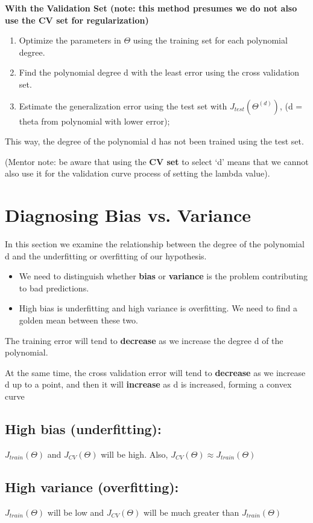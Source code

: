 \textbf{With the Validation Set (note: this method presumes we do not also use the CV set for regularization)}

\begin{enumerate}
\item Optimize the parameters in $\Theta$ using the training set for each polynomial degree.
\item Find the polynomial degree d with the least error using the cross validation set.
\item Estimate the generalization error using the test set with $J_{test}(\Theta^{(d)})$, (d = theta from polynomial with lower error);
\end{enumerate}

This way, the degree of the polynomial d has not been trained using the test set.

(Mentor note: be aware that using the \textbf{CV set} to select `d' means that we cannot also use it for the validation curve process of setting the lambda value).

\section{Diagnosing Bias vs. Variance}
In this section we examine the relationship between the degree of the polynomial d and the underfitting or overfitting of our hypothesis.
\begin{itemize}
\item We need to distinguish whether \textbf{bias} or \textbf{variance} is the problem contributing to bad predictions.
\item High bias is underfitting and high variance is overfitting. We need to find a golden mean between these two.
\end{itemize}

The training error will tend to \textbf{decrease} as we increase the degree d of the polynomial.

At the same time, the cross validation error will tend to \textbf{decrease} as we increase d up to a point, and then it will \textbf{increase} as d is increased, forming a convex curve
\subsection{High bias (underfitting): }
$J_{train}(\Theta)$ and $J_{CV}(\Theta)$ will be high. Also, $J_{CV}(\Theta) \approx J_{train}(\Theta)$ 
\subsection{High variance (overfitting):}
$J_{train}(\Theta)$ will be low and $J_{CV}(\Theta)$  will be much greater than $J_{train}(\Theta)$


